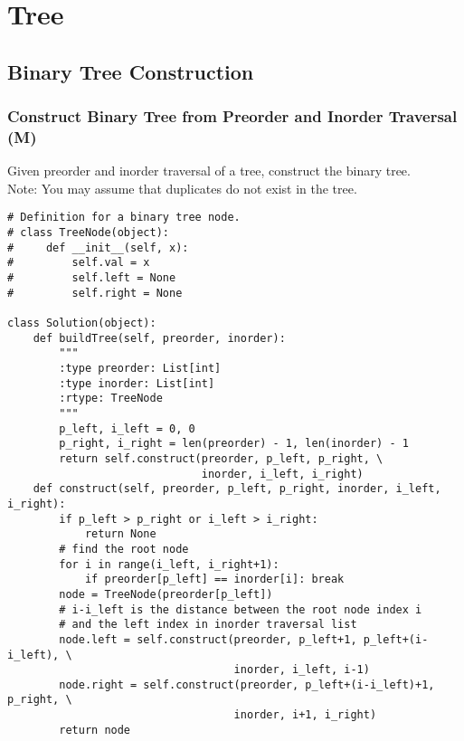 \chapter{Tree}
\section{Binary Tree Construction}
\subsection{Construct Binary Tree from Preorder and Inorder Traversal (M)}
Given preorder and inorder traversal of a tree, construct the binary tree.\\

Note: You may assume that duplicates do not exist in the tree. \\

\begin{lstlisting}
# Definition for a binary tree node.
# class TreeNode(object):
#     def __init__(self, x):
#         self.val = x
#         self.left = None
#         self.right = None

class Solution(object):
    def buildTree(self, preorder, inorder):
        """
        :type preorder: List[int]
        :type inorder: List[int]
        :rtype: TreeNode
        """
        p_left, i_left = 0, 0
        p_right, i_right = len(preorder) - 1, len(inorder) - 1
        return self.construct(preorder, p_left, p_right, \
                              inorder, i_left, i_right)
    def construct(self, preorder, p_left, p_right, inorder, i_left, i_right):
        if p_left > p_right or i_left > i_right:
            return None
        # find the root node
        for i in range(i_left, i_right+1):
            if preorder[p_left] == inorder[i]: break
        node = TreeNode(preorder[p_left])
        # i-i_left is the distance between the root node index i 
        # and the left index in inorder traversal list
        node.left = self.construct(preorder, p_left+1, p_left+(i-i_left), \
                                   inorder, i_left, i-1)
        node.right = self.construct(preorder, p_left+(i-i_left)+1, p_right, \
                                   inorder, i+1, i_right)
        return node
\end{lstlisting}
           

